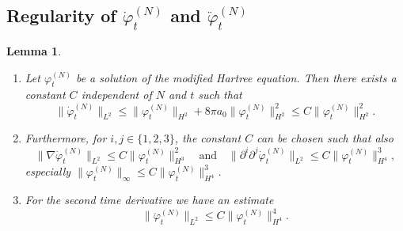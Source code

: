 \documentclass[11pt,a4paper]{scrartcl}
\newtheorem{lem}[thm]{Lemma}
\newcommand{\norm}[1]{\lVert#1\rVert}	%
\newcommand{\ph}{\varphi_t^{(N)}}	%
\newcommand{\phdot}{\dot{\varphi}_t^{(N)}}	%
\newcommand{\phddot}{\ddot{\varphi}_t^{(N)}}	%
\newcommand{\bd}{\begin{displaymath}}			%
\newcommand{\ed}{\end{displaymath}}
\begin{document}
\subsection{Regularity of $\phdot$ and $\phddot$}
\begin{lem}
\label{lm:phdotregularity}
\begin{enumerate}
 \item Let $\ph$ be a solution of the modified Hartree equation. Then there exists a constant $C$ independent of $N$ and $t$ such that
 \bd
\norm{\phdot}_{L^2} \leq \norm{\ph}_{H^2} + 8\pi a_0 \norm{\ph}_{H^2}^2 \leq C \norm{\ph}_{H^2}^2.
\ed
\item Furthermore, for $i, j \in \{1,2,3\}$, the constant $C$ can be chosen such that also
\bd
\norm{\nabla \phdot}_{L^2} \leq C \norm{\ph}_{H^3}^2 \quad \mbox{and} \quad
\norm{\partial^i \partial^j \phdot}_{L^2} \leq C \norm{\ph}_{H^4}^3,
\ed
especially $\norm{\ph}_\infty \leq C \norm{\ph}_{H^4}^3$.
\item
For the second time derivative we have an estimate
\bd
\norm{\phddot}_{L^2} \leq C \norm{\ph}_{H^4}^4.
\ed
\end{enumerate}
\end{lem}
\end{document}
